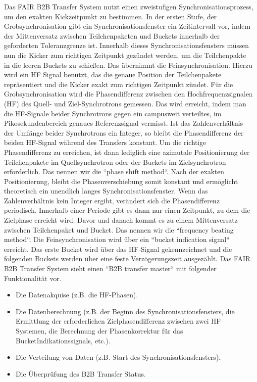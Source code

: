 Das FAIR B2B Transfer System nutzt einen zweistufigen Synchronisationsprozess, um den exakten Kickzeitpunkt zu bestimmen. In der ersten Stufe, der Grobsynchronisation gibt ein Synchronisationsfenster ein Zeitintervall vor, indem der Mittenversatz zwischen Teilchenpaketen und Buckets innerhalb der geforderten Toleranzgrenze ist. Innerhalb dieses Synchronisationsfensters m\"ussen nun die
Kicker zum richtigen Zeitpunkt gez\"undet werden, um die Teilchenpakte in die leeren Buckets zu schie\ss en. Das \"ubernimmt die Feinsynchronisation. Hierzu wird ein HF Signal benutzt, das die genaue Position der Teilchenpakete repr\"asentiert und die
Kicker exakt zum richtigen Zeitpunkt z\"undet. F\"ur die Grobsynchronisation wird die Phasendifferenz zwischen den Hochfrequenzsignalen (HF) des Quell- und Ziel-Synchrotrons gemessen. Das wird erreicht, indem man die HF-Signale beider Synchrotrons gegen ein campusweit verteiltes, im Pikosekundenbereich genaues Referenzsignal vermisst. Ist das Zahlenverh\"altnis der Umf\"ange beider Synchrotrons ein Integer, so bleibt die Phasendifferenz der beiden HF-Signal w\"ahrend des Transfers konstant. Um die richtige Phasendifferenz zu erreichen, ist dann lediglich eine azimutale Positionierung der Teilchenpakete im Quellsynchrotron oder der Buckets im Zielsynchrotron erforderlich. Das nennen wir die ``phase shift method``. Nach der exakten Positionierung, bleibt die Phasenverschiebung somit konstant und erm\"oglicht theoretisch ein unendlich langes Synchronisationsfenster. Wenn das Zahlenverh\"altnis kein Integer ergibt, ver\"andert sich die Phasendifferenz periodisch. Innerhalb einer Periode gibt es dann nur einen Zeitpunkt, zu dem die Zielphase erreicht wird. Davor und danach kommt es zu einem Mittenversatz zwischen Teilchenpaket und Bucket. Das nennen wir die ``frequency beating method``. Die Feinsynchronisation wird \"uber ein ``bucket indication signal`` erreicht. Das erste
Bucket wird \"uber das HF-Signal gekennzeichnet und die folgenden Buckets werden \"uber eine feste Verz\"ogerungszeit ausgez\"ahlt.
Das FAIR B2B Transfer System sieht einen ``B2B transfer master`` mit folgender Funktionalit\"at vor.
\begin{itemize}

\item Die Datenakquise (z.B. die HF-Phasen).
\item Die Datenberechnung (z.B. der Beginn des Synchronisationsfensters, die Ermittlung der erforderlichen Zielphasendifferenz zwischen zwei HF Systemen, die Berechnung der Phasenkorrektur f\"ur das BucketIndikationssignals,
etc.).
\item Die Verteilung von Daten (z.B. Start des Synchronisationsfensters).
\item Die \"Uberpr\"ufung des B2B Transfer Status.
\end{itemize}


